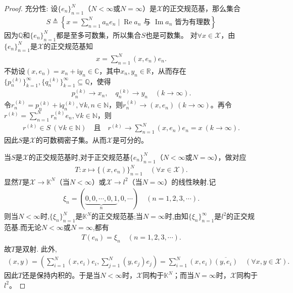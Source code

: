 \documentclass[../../main.tex]{subfiles}%
\begin{document}
\begin{proof}
{\heiti 充分性:} 设$\{e_n\}_{n=1}^{N}$（$N < \infty$或$N = \infty$）是$\mathscr{X}$的正交规范基，那么集合
\begin{align*}
S\triangleq \left\{x = \sum\limits_{n=1}^{N} a_n e_n \mid \operatorname{Re}a_n \text{ 与 } \operatorname{Im}a_n \text{ 皆为有理数}\right\}
\end{align*}
因为$\mathbb{Q}$和$\{ e_n \}_{n=1}^{N}$都是至多可数集，所以集合$S$也是可数集。
对$\forall x\in \mathscr{X}$，由$\{ e_n \}_{n=1}^{N}$是$\mathscr{X}$的正交规范基知
\begin{align*}
x=\sum\limits_{n=1}^N (x,e_n) e_n.
\end{align*}
不妨设$(x,e_n)=x_n+\mathrm{i}y_n\in \mathbb{C}$，其中$x_n,y_n\in \mathbb{R}$，从而存在$\{ p_{n}^{(k)} \}_{k=1}^{\infty},\{ q_{n}^{(k)} \}_{k=1}^{\infty}\subseteq \mathbb{Q}$，使得
\begin{align*}
p_{n}^{(k)}\rightarrow x_n,\quad q_{n}^{(k)}\rightarrow y_n \quad (k\rightarrow \infty).
\end{align*}
令$r_{n}^{(k)}=p_{n}^{(k)}+\mathrm{i}q_{n}^{(k)},\forall k,n\in \mathbb{N}$，则$r_{n}^{(k)}\rightarrow (x,e_n) \ (k\rightarrow \infty)$。再令$r^{(k)}=\sum\limits_{n=1}^N r_{n}^{(k)} e_n,\forall k\in \mathbb{N}$，则
\begin{align*}
r^{(k)}\in S \ (\forall k\in \mathbb{N}) \quad \text{且} \quad r^{(k)}\rightarrow \sum\limits_{n=1}^N (x,e_n) e_n=x \ (k\rightarrow \infty).
\end{align*}
因此$S$是$\mathscr{X}$的可数稠密子集。从而$\mathscr{X}$是可分的。

当$S$是$\mathscr{X}$的正交规范基时,对于正交规范基$\{e_n\}_{n=1}^{N}$（$N < \infty$或$N = \infty$），做对应
\begin{align*}
T: x \mapsto \{(x, e_n)\}_{n=1}^{N} \quad (\forall x \in \mathscr{X}).
\end{align*}
显然$T$是$\mathscr{X} \to \mathbb{K}^N$（当$N < \infty$）或$\mathscr{X} \to l^2$（当$N = \infty$）的线性映射.记
\begin{align*}
\xi_n = (\underbrace{0, 0, \cdots, 0, 1}_{n}, 0, \cdots) \quad (n=1,2,3,\cdots).
\end{align*}
则当$N<\infty$时,$\{\xi_n\}_{n=1}^{N}$是$\mathbb{K}^N$的正交规范基;当$N=\infty$时,由知$\{\xi_n\}_{n=1}^{\infty}$是$l^2$的正交规范基.而无论$N<\infty$或$N=\infty$,都有
\begin{align*}
T(e_n) = \xi_n\quad (n=1,2,3,\cdots).
\end{align*}
故$T$是双射.
此外,
\begin{align*}
(x, y) = \left( \sum\limits_{i=1}^{N} (x, e_i) e_i, \sum\limits_{j=1}^{N} (y, e_j) e_j \right) 
= \sum\limits_{i=1}^{N} (x, e_i) \overline{(y, e_i)} \quad (\forall x, y \in \mathscr{X}).
\end{align*}
因此$T$还是保持内积的。于是当$N < \infty$时，$\mathscr{X}$同构于$\mathbb{K}^N$；而当$N = \infty$时，$\mathscr{X}$同构于$l^2$。
\end{proof}
\end{document}
